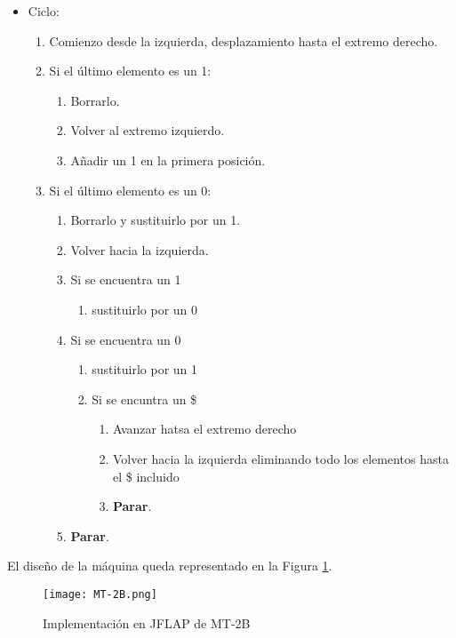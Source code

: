 \begin{itemize}
    \item Ciclo:
    \begin{enumerate}[1.]
        \item Comienzo desde la izquierda, desplazamiento hasta el extremo derecho.
        \item Si el último elemento es un 1:
        \begin{enumerate}[1.]
            \item Borrarlo.
            \item Volver al extremo izquierdo.
            \item Añadir un 1 en la primera posición.
        \end{enumerate}
        \item Si el último elemento es un 0:
        \begin{enumerate}[1.]
            \item Borrarlo y sustituirlo por un 1.
            \item Volver hacia la izquierda.
            \item Si se encuentra un 1 
            \begin{enumerate}[1.] 
                \item sustituirlo por un 0
            \end{enumerate}
            \item Si se encuentra un 0
            \begin{enumerate}[1.]
                \item sustituirlo por un 1
                \item Si se encuntra un \$
                \begin{enumerate}[1.]
                    \item Avanzar hatsa el extremo derecho
                    \item Volver hacia la izquierda eliminando todo los elementos hasta el \$ incluido
                    \item \textbf{Parar}.
                \end{enumerate}
            \end{enumerate}
            \item \textbf{Parar}.
        \end{enumerate}
    \end{enumerate}
\end{itemize}

El diseño de la máquina queda representado en la Figura \ref{fig:MT-2B}.

\begin{figure}[h]
    \centering
    \texttt{[image: MT-2B.png]}
    \caption{Implementación en JFLAP de MT-2B}
    \label{fig:MT-2B}
\end{figure}